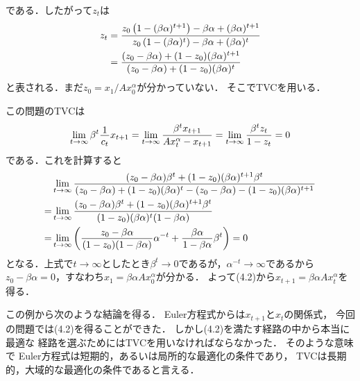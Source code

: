 \documentclass[a4paper,11pt]{jsarticle}
\DeclareRobustCommand{\lfrac}[2]{{\lower.4ex\hbox{\begingroup\ensuremath{#1}\endgroup}\over{\hspace{.2mm}#2\hspace{.2mm}}}}
\begin{document}
である．したがって$z_t$は
\jot=6pt
\begin{align}
	z_t	&=\lfrac{z_0\left(1-(\beta \alpha)^{t+1}\right)-\beta \alpha+(\beta \alpha)^{t+1}}{z_0\left(1-(\beta \alpha)^t\right)-\beta \alpha+(\beta \alpha)^t}\nonumber \\
		&=\lfrac{(z_0-\beta \alpha)+(1-z_0)(\beta \alpha)^{t+1}}{(z_0-\beta \alpha)+(1-z_0)(\beta \alpha)^t}
\end{align}
と表される．まだ$z_0=x_1/Ax_0^\alpha$が分かっていない．
そこでTVCを用いる．

この問題のTVCは
\begin{align*}
		\lim_{t \to \infty}\beta^t \lfrac{1}{c_t}x_{t+1}=\lim_{t \to \infty}\frac{\beta^t x_{t+1}}{Ax_t^\alpha-x_{t+1}}=\lim_{t \to \infty}\frac{\beta^t z_t}{1-z_t}=0
\end{align*}
である．これを計算すると
\jot=7pt
\begin{align*}
        	&\lim_{t \to \infty}
	\lfrac{(z_0-\beta \alpha)\beta^t+(1-z_0)(\beta \alpha)^{t+1}\beta^t}%
        {(z_0-\beta \alpha)+(1-z_0)(\beta \alpha)^t-(z_0-\beta \alpha)-(1-z_0)(\beta \alpha)^{t+1}}\\
        =&\lim_{t \to \infty}
	\frac{(z_0-\beta \alpha)\beta^t+(1-z_0)(\beta \alpha)^{t+1}\beta^t}%
        {(1-z_0)(\beta \alpha)^t(1-\beta \alpha)}\\
        =&\lim_{t \to \infty}\left(\lfrac{z_0-\beta \alpha}{(1-z_0)(1-\beta \alpha)}\alpha^{-t}+
	\lfrac{\beta \alpha}{1-\beta \alpha}\beta^t\right)=0
\end{align*}
\jot=3pt
となる．上式で$t \to \infty$としたとき$\beta^t \to 0$であるが，$\alpha^{-t} \to \infty$であるから$z_0-\beta \alpha=0$，すなわち$x_1=\beta \alpha A x_0^\alpha$が分かる．
よって(4.2)から$x_{t+1}=\beta\alpha Ax_t^\alpha$を得る．

\bigskip

この例から次のような結論を得る．
Euler方程式からは$x_{t+1}$と$x_t$の関係式，
今回の問題では(4.2)を得ることができた．
しかし(4.2)を満たす経路の中から本当に最適な
経路を選ぶためにはTVCを用いなければならなかった．
そのような意味で
Euler方程式は短期的，あるいは局所的な最適化の条件であり，
TVCは長期的，大域的な最適化の条件であると言える．

\vspace{7mm}
\end{document}
